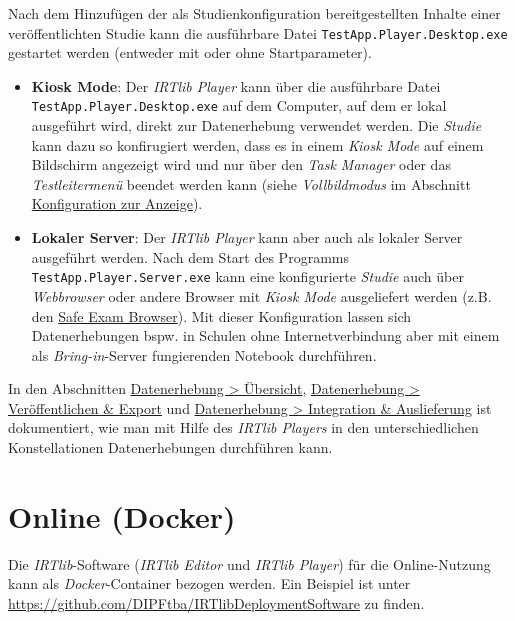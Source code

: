 \documentclass[
  letterpaper,
  DIV=11]{scrreprt}
\begin{document}
Nach dem Hinzufügen der als Studienkonfiguration bereitgestellten
Inhalte einer veröffentlichten Studie kann die ausführbare Datei
\texttt{TestApp.Player.Desktop.exe} gestartet werden (entweder mit oder
ohne Startparameter).

\begin{itemize}
\item
  \textbf{Kiosk Mode}: Der \emph{IRTlib Player} kann über die
  ausführbare Datei \texttt{TestApp.Player.Desktop.exe} auf dem
  Computer, auf dem er lokal ausgeführt wird, direkt zur Datenerhebung
  verwendet werden. Die \emph{Studie} kann dazu so konfirugiert werden,
  dass es in einem \emph{Kiosk Mode} auf einem Bildschirm angezeigt wird
  und nur über den \emph{Task Manager} oder das \emph{Testleitermenü}
  beendet werden kann (siehe \emph{Vollbildmodus} im Abschnitt
  \protect\hyperlink{konfiguration-zur-anzeige}{Konfiguration zur
  Anzeige}).
\item
  \textbf{Lokaler Server}: Der \emph{IRTlib Player} kann aber auch als
  lokaler Server ausgeführt werden. Nach dem Start des Programms
  \texttt{TestApp.Player.Server.exe} kann eine konfigurierte
  \emph{Studie} auch über \emph{Webbrowser} oder andere Browser mit
  \emph{Kiosk Mode} ausgeliefert werden (z.B. den
  \href{https://safeexambrowser.org/}{Safe Exam Browser}). Mit dieser
  Konfiguration lassen sich Datenerhebungen bspw. in Schulen ohne
  Internetverbindung aber mit einem als \emph{Bring-in}-Server
  fungierenden Notebook durchführen.
\end{itemize}

In den Abschnitten \href{data-collection-overview.qmd}{Datenerhebung
\textgreater{} Übersicht},
\href{data-collection-publish-and-export.qmd}{Datenerhebung
\textgreater{} Veröffentlichen \& Export} und
\href{data-collection-player-integration.qmd}{Datenerhebung
\textgreater{} Integration \& Auslieferung} ist dokumentiert, wie man
mit Hilfe des \emph{IRTlib Players} in den unterschiedlichen
Konstellationen Datenerhebungen durchführen kann.

\hypertarget{online-docker}{%
\section{Online (Docker)}\label{online-docker}}

Die \emph{IRTlib}-Software (\emph{IRTlib Editor} und \emph{IRTlib
Player}) für die Online-Nutzung kann als \emph{Docker}-Container bezogen
werden. Ein Beispiel ist unter
\url{https://github.com/DIPFtba/IRTlibDeploymentSoftware} zu finden.
\end{document}
